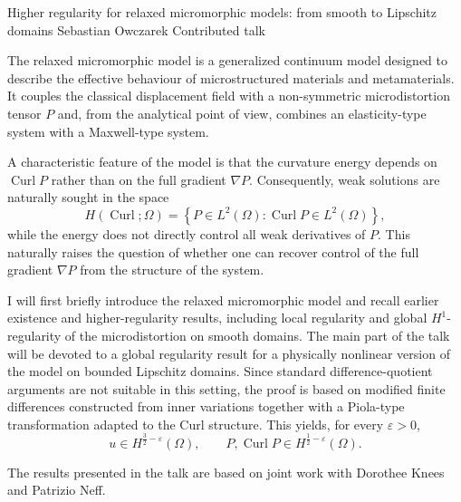 \abstractheading
  {Higher regularity for relaxed micromorphic models: from smooth to Lipschitz domains}
  {Sebastian Owczarek}
  {\affilWarsawTech}
  {Contributed talk}

The relaxed micromorphic model is a generalized continuum model designed to
describe the effective behaviour of microstructured materials and metamaterials.
It couples the classical displacement field with a non-symmetric microdistortion
tensor $P$ and, from the analytical point of view, combines an elasticity-type
system with a Maxwell-type system.

A characteristic feature of the model is that the curvature energy depends on
$\operatorname{Curl}P$ rather than on the full gradient $\nabla P$.
Consequently, weak solutions are naturally sought in the space
\[
H(\operatorname{Curl};\Omega)
=\left\{P\in L^{2}(\Omega):\operatorname{Curl}P\in L^{2}(\Omega)\right\},
\]
while the energy does not directly control all weak derivatives of $P$. This
naturally raises the question of whether one can recover control of the full
gradient $\nabla P$ from the structure of the system.

I will first briefly introduce the relaxed micromorphic model and recall earlier
existence and higher-regularity results, including local regularity and global
$H^{1}$-regularity of the microdistortion on smooth domains. The main part of
the talk will be devoted to a global regularity result for a physically nonlinear
version of the model on bounded Lipschitz domains. Since standard
difference-quotient arguments are not suitable in this setting, the proof is
based on modified finite differences constructed from inner variations together
with a Piola-type transformation adapted to the Curl structure. This yields, for
every $\varepsilon>0$,
\[
u\in H^{\frac{3}{2}-\varepsilon}(\Omega),
\qquad
P,\operatorname{Curl}P\in H^{\frac{1}{2}-\varepsilon}(\Omega).
\]

The results presented in the talk are based on joint work with Dorothee Knees
and Patrizio Neff.

\begin{abstractreferences}
\end{abstractreferences}
